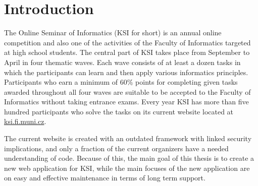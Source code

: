 \documentclass[
  digital, %
  oneside, %
  lof,     %
  nolot,     %
]{fithesis4}
\begin{document}
\clearpage
\printnoidxglossary[title={Abbreviations}, type=\acronymtype]
\printnoidxglossary[title={Glossary}]

\chapter*{Introduction}

\mdstart

The Online Seminar of Informatics (KSI for short) is an annual online competition and also one of the activities of the Faculty of Informatics targeted at high school students. The central part of KSI takes place from September to April in four thematic waves. Each wave consists of at least a dozen tasks in which the participants can learn and then apply various informatics principles. Participants who earn a minimum of 60\% points for completing given tasks awarded throughout all four waves are suitable to be accepted to the Faculty of Informatics without taking entrance exams. Every year KSI has more than five hundred participants who solve the tasks on its current website located at \href{https://ksi.fi.muni.cz}{ksi.fi.muni.cz}.

The current website is created with an outdated framework with linked security implications, and only a fraction of the current organizers have a needed understanding of code. Because of this, the main goal of this thesis is to create a new web application for KSI, while the main focuses of the new application are on easy and effective maintenance in terms of long term support.
\end{document}

